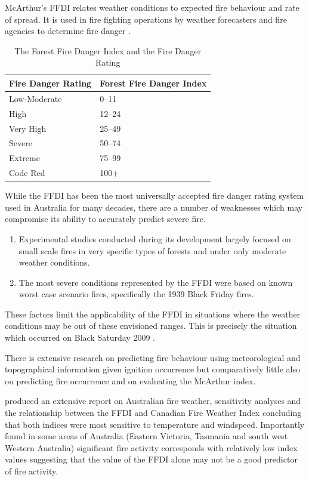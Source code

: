 \documentclass[11pt,a4paper]{article}
\begin{document}
McArthur's FFDI relates weather conditions to expected fire behaviour and rate of spread. It is used in fire fighting operations by weather forecasters and fire agencies to determine fire danger \citep{clarke2013}.

\begin{table}
  \centering
  \begin{tabular}{ll}
    \toprule
    Fire Danger Rating & Forest Fire Danger Index \\
    \midrule
    Low-Moderate       & 0--11 \\
    High               & 12--24 \\
    Very High          & 25--49\\
    Severe             & 50--74\\
    Extreme            & 75--99 \\
    Code Red           & 100+ \\
    \bottomrule
  \end{tabular}
  \caption{The Forest Fire Danger Index and the Fire Danger Rating}
  \label{table:FDR}
\end{table}

While the FFDI has been the most universally accepted fire danger rating system used in Australia for many decades, there are a number of weaknesses which may compromise its ability to accurately predict severe fire.

\begin{enumerate}
  \item Experimental studies conducted during its development largely focused on small scale fires in very specific types of forests and under only moderate weather conditions.
  \item The most severe conditions represented by the FFDI were based on known worst case scenario fires, specifically the 1939 Black Friday fires.
\end{enumerate}

These factors limit the applicability of the FFDI in situations where the weather conditions may be out of these envisioned ranges. This is precisely the situation which occurred on Black Saturday 2009 \citep{harris12}.

There is extensive research on predicting fire behaviour using meteorological and topographical information given ignition occurrence but comparatively little also on  predicting fire occurrence and on evaluating the McArthur index.

\citet{dowdy10} produced an extensive report on Australian fire weather, sensitivity analyses and the relationship between the FFDI and Canadian Fire Weather Index concluding that both indices were most sensitive to temperature and windspeed. Importantly \citet{dowdy10} found in some areas of Australia (Eastern Victoria, Tasmania and south west Western Australia) significant fire activity corresponds with relatively low index values suggesting that the value of the FFDI alone may not be a good predictor of fire activity.
\end{document}
